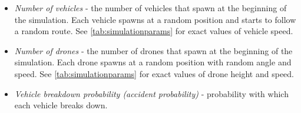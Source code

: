 \documentclass[]{nsm-thesis}
\begin{document}
\begin{itemize}

	\item \emph{Number of vehicles} - the number of vehicles that spawn at the beginning of the simulation. Each vehicle spawns at a random position and starts to follow a random route. See \cref{tab:simulationparams} for exact values of vehicle speed.
	
	\item \emph{Number of drones} - the number of drones that spawn at the beginning of the simulation. Each drone spawns at a random position with random angle and speed. See \cref{tab:simulationparams} for exact values of drone height and speed.
	
	\item \emph{Vehicle breakdown probability (accident probability)} - probability with which each vehicle breaks down.
\end{itemize}
\end{document}
